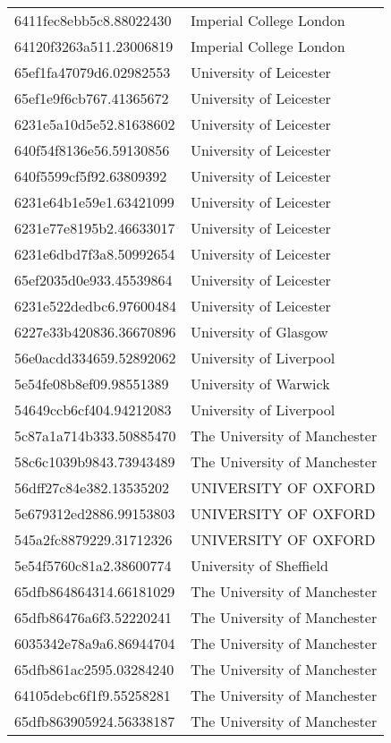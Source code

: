 \begin{tabular}{ll}
6411fec8ebb5c8.88022430 & Imperial College London \\
64120f3263a511.23006819 & Imperial College London \\
65ef1fa47079d6.02982553 & University of Leicester \\
65ef1e9f6cb767.41365672 & University of Leicester \\
6231e5a10d5e52.81638602 & University of Leicester \\
640f54f8136e56.59130856 & University of Leicester \\
640f5599cf5f92.63809392 & University of Leicester \\
6231e64b1e59e1.63421099 & University of Leicester \\
6231e77e8195b2.46633017 & University of Leicester \\
6231e6dbd7f3a8.50992654 & University of Leicester \\
65ef2035d0e933.45539864 & University of Leicester \\
6231e522dedbc6.97600484 & University of Leicester \\
6227e33b420836.36670896 & University of Glasgow \\
56e0acdd334659.52892062 & University of Liverpool \\
5e54fe08b8ef09.98551389 & University of Warwick \\
54649ccb6cf404.94212083 & University of Liverpool \\
5c87a1a714b333.50885470 & The University of Manchester \\
58c6c1039b9843.73943489 & The University of Manchester \\
56dff27c84e382.13535202 & UNIVERSITY OF OXFORD \\
5e679312ed2886.99153803 & UNIVERSITY OF OXFORD \\
545a2fc8879229.31712326 & UNIVERSITY OF OXFORD \\
5e54f5760c81a2.38600774 & University of Sheffield \\
65dfb864864314.66181029 & The University of Manchester \\
65dfb86476a6f3.52220241 & The University of Manchester \\
6035342e78a9a6.86944704 & The University of Manchester \\
65dfb861ac2595.03284240 & The University of Manchester \\
64105debc6f1f9.55258281 & The University of Manchester \\
65dfb863905924.56338187 & The University of Manchester \\

\end{tabular}
